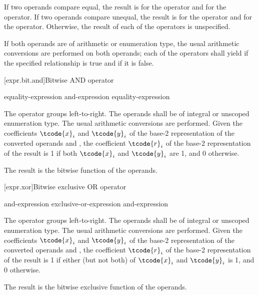 \pnum
If two operands compare equal, the result is  for
the \tcode{==} operator and  for the \tcode{!=} operator. If two operands
compare unequal, the result is  for the \tcode{==} operator and
 for the \tcode{!=} operator. Otherwise, the result of each of the
operators is unspecified.

\pnum
If both operands are of arithmetic or enumeration type, the usual arithmetic
conversions are performed on both operands; each of the operators shall yield
 if the specified relationship is true and  if it is
false.

[expr.bit.and]{Bitwise AND operator}%
%
%
%
%

\begin{bnf}
\br
    equality-expression\br
    and-expression \terminal{\&} equality-expression
\end{bnf}

\pnum
The \tcode{\&} operator groups left-to-right.
The operands shall be of integral or unscoped enumeration type.
The usual arithmetic conversions are performed.
Given the coefficients $\tcode{x}_i$ and $\tcode{y}_i$
of the base-2 representation
of the converted operands  and ,
the coefficient $\tcode{r}_i$
of the base-2 representation of the result 
is 1 if both $\tcode{x}_i$ and $\tcode{y}_i$ are 1, and 0 otherwise.
\begin{note}
The result is the bitwise  function of the operands.
\end{note}

[expr.xor]{Bitwise exclusive OR operator}%
%
%

\begin{bnf}
\br
    and-expression\br
    exclusive-or-expression \terminal{\caret} and-expression
\end{bnf}

\pnum
The \tcode{\caret} operator groups left-to-right.
The operands shall be of integral or unscoped enumeration type.
The usual arithmetic conversions are performed.
Given the coefficients $\tcode{x}_i$ and $\tcode{y}_i$
of the base-2 representation
of the converted operands  and ,
the coefficient $\tcode{r}_i$
of the base-2 representation of the result 
is 1 if either (but not both) of $\tcode{x}_i$ and $\tcode{y}_i$ is 1,
and 0 otherwise.
\begin{note}
The result is the bitwise exclusive  function of the operands.
\end{note}

